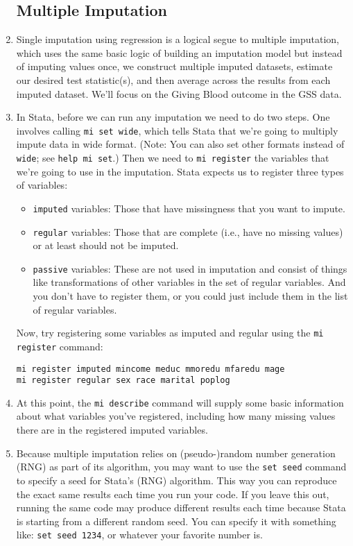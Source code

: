 \documentclass[a4paper,12pt]{article}
\begin{document}
\begin{enumerate}
\subsection*{Multiple Imputation}

\item Single imputation using regression is a logical segue to multiple imputation, which uses the same basic logic of building an imputation model but instead of imputing values once, we construct multiple imputed datasets, estimate our desired test statistic(s), and then average across the results from each imputed dataset. We'll focus on the Giving Blood outcome in the GSS data. 

\item In Stata, before we can run any imputation we need to do two steps. One involves calling \texttt{mi set wide}, which tells Stata that we're going to multiply impute data in wide format. (Note: You can also set other formats instead of \texttt{wide}; see \texttt{help mi set}.) Then we need to \texttt{mi register} the variables that we're going to use in the imputation. Stata expects us to register three types of variables:
	\begin{itemize}
	\item \texttt{imputed} variables: Those that have missingness that you want to impute.
	\item \texttt{regular} variables: Those that are complete (i.e., have no missing values) or at least should not be imputed.
	\item \texttt{passive} variables: These are not used in imputation and consist of things like transformations of other variables in the set of regular variables. And you don't have to register them, or you could just include them in the list of regular variables.
	\end{itemize}

Now, try registering some variables as imputed and regular using the \texttt{mi register} command:
\begin{verbatim}
mi register imputed mincome meduc mmoredu mfaredu mage
mi register regular sex race marital poplog
\end{verbatim}

\item At this point, the \texttt{mi describe} command will supply some basic information about what variables you've registered, including how many missing values there are in the registered imputed variables.

\item Because multiple imputation relies on (pseudo-)random number generation (RNG) as part of its algorithm, you may want to use the \texttt{set seed} command to specify a seed for Stata's (RNG) algorithm. This way you can reproduce the exact same results each time you run your code. If you leave this out, running the same code may produce different results each time because Stata is starting from a different random seed. You can specify it with something like: \texttt{set seed 1234}, or whatever your favorite number is.


\end{enumerate}
\end{document}
